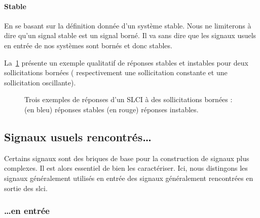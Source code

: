 \paragraph{Stable}
En se basant sur la définition donnée d'un système stable.
Nous ne limiterons à dire qu'un signal stable est un signal 
borné. Il va sans dire que les signaux usuels en entrée
de nos systèmes sont bornés et donc stables.

La~\cref{fig-stabilite_signaux} présente un exemple qualitatif de réponses 
stables et instables pour deux sollicitations bornées ( respectivement une 
sollicitation constante et une sollicitation oscillante).


\begin{figure}[!ht]
\begin{center}

\caption{Trois exemples de réponses d'un SLCI à des sollicitations bornées : 
         (en bleu)  réponses stables 
         (en rouge) réponses instables.\label{fig-stabilite_signaux}}
\end{center}                
\end{figure}


\clearpage
\subsection{Signaux usuels rencontrés\ldots\label{sec-signaux_usuels}}

Certains signaux sont des briques de base pour la construction de
signaux plus complexes. Il est alors essentiel de bien les caractériser.
Ici, nous distingons les signaux généralement utilisés en 
entrée des signaux généralement rencontrées en sortie des \gls{slci}.

\subsubsection{\ldots en entrée}

